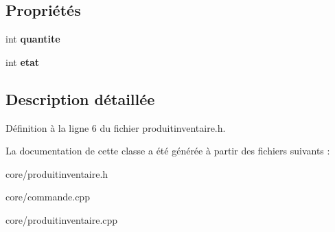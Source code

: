 \subsection*{Propriétés}
\begin{DoxyCompactItemize}
\item 
\hypertarget{class_produit_inventaire_a5493338d9b5bd8b91816e27f76e0c807}{
int {\bfseries quantite}}
\label{d2/d66/class_produit_inventaire_a5493338d9b5bd8b91816e27f76e0c807}

\item 
\hypertarget{class_produit_inventaire_a74e0b82286dd0ae874f7199a09a59e36}{
int {\bfseries etat}}
\label{d2/d66/class_produit_inventaire_a74e0b82286dd0ae874f7199a09a59e36}

\end{DoxyCompactItemize}


\subsection{Description détaillée}


Définition à la ligne 6 du fichier produitinventaire.h.



La documentation de cette classe a été générée à partir des fichiers suivants :\begin{DoxyCompactItemize}
\item 
core/produitinventaire.h\item 
core/commande.cpp\item 
core/produitinventaire.cpp\end{DoxyCompactItemize}
